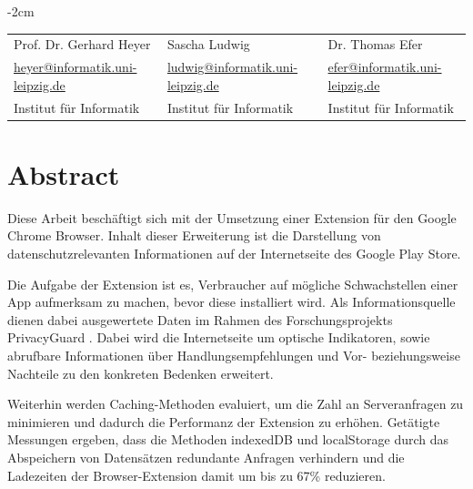 \documentclass[11pt, a4paper, twoside, openright, final]{book}
\makeatletter
\numberwithin{equation}{chapter}		%
\renewcommand*{\cleardoublepage}{\clearpage\if@twoside \ifodd\c@page\else
\hbox{}%
\thispagestyle{empty}%
\newpage%
\if@twocolumn\hbox{}\newpage\fi\fi\fi}
\newcommand{\1}{\mathbbm{1}}
\makeatother
\begin{document}
\begin{titlepage}
\begin{adjustwidth*}{}{-2cm}
\begin{tabular}{*{3}{C{4.5cm}}}
			\small Prof. Dr. Gerhard Heyer  & 
			\small Sascha Ludwig & 
			\small Dr. Thomas Efer \\
			
			\small \href{mailto:heyer@informatik.uni-leipzig.de }{heyer@informatik.uni-leipzig.de } & 
			\small \href{mailto:ludwig@informatik.uni-leipzig.de}{ludwig@informatik.uni-leipzig.de} &
			\small \href{mailto:efer@informatik.uni-leipzig.de }{efer@informatik.uni-leipzig.de } \\
			
			\small Institut für Informatik & 
			\small Institut für Informatik & 
			\small Institut für Informatik\\
		\end{tabular}
		
		\vspace{1.0cm}
		\centering{\today}
	\end{adjustwidth*}
\end{titlepage}
\cleardoublepage





\setcounter{page}{1}	%

\chapter*{Abstract}
\label{c:abstract}

Diese Arbeit beschäftigt sich mit der Umsetzung einer Extension für den Google Chrome Browser. Inhalt dieser Erweiterung ist die Darstellung von datenschutzrelevanten Informationen auf der Internetseite des Google Play Store.

Die Aufgabe der Extension ist es, Verbraucher auf mögliche Schwachstellen einer App aufmerksam zu machen, bevor diese installiert wird. Als Informationsquelle dienen dabei ausgewertete Daten im Rahmen des Forschungsprojekts \glqq PrivacyGuard \grqq{}.
Dabei wird die Internetseite um optische Indikatoren, sowie abrufbare Informationen über Handlungsempfehlungen und  Vor- beziehungsweise Nachteile zu den konkreten Bedenken erweitert.

Weiterhin werden Caching-Methoden evaluiert, um die Zahl an Serveranfragen zu minimieren und dadurch die Performanz der Extension zu erhöhen. Getätigte Messungen ergeben, dass die Methoden \glqq indexedDB \grqq{} und \glqq localStorage \grqq{} durch das Abspeichern von Datensätzen redundante Anfragen verhindern und die Ladezeiten der Browser-Extension damit um bis zu 67\% reduzieren.
\end{document}

